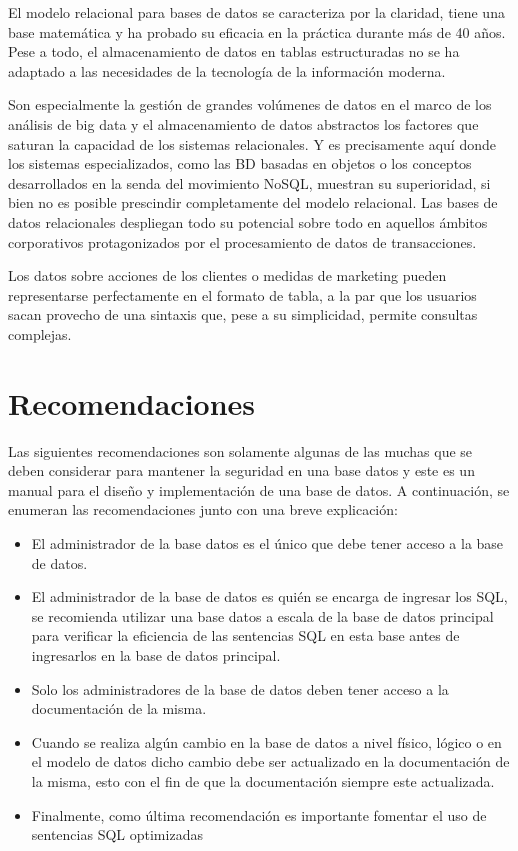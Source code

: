\documentclass[twoside,twocolumn]{article}
\begin{document}
El modelo relacional para bases de datos se caracteriza por la claridad, tiene una base matemática y ha probado su eficacia en la práctica durante más de 40 años. Pese a todo, el almacenamiento de datos en tablas estructuradas no se ha adaptado a las necesidades de la tecnología de la información moderna.

Son especialmente la gestión de grandes volúmenes de datos en el marco de los análisis de big data y el almacenamiento de datos abstractos los factores que saturan la capacidad de los sistemas relacionales. Y es precisamente aquí donde los sistemas especializados, como las BD basadas en objetos o los conceptos desarrollados en la senda del movimiento NoSQL, muestran su superioridad, si bien no es posible prescindir completamente del modelo relacional. Las bases de datos relacionales despliegan todo su potencial sobre todo en aquellos ámbitos corporativos protagonizados por el procesamiento de datos de transacciones.

Los datos sobre acciones de los clientes o medidas de marketing pueden representarse perfectamente en el formato de tabla, a la par que los usuarios sacan provecho de una sintaxis que, pese a su simplicidad, permite consultas complejas.

\section{Recomendaciones}

Las siguientes recomendaciones son solamente algunas de las muchas que se deben considerar para mantener la seguridad en una base datos y este es un manual para el diseño y implementación de una base de datos. A continuación, se enumeran las recomendaciones junto con una breve explicación:

\begin{itemize}
\item El administrador de la base datos es el único que debe tener acceso a la base de datos.
\item El administrador de la base de datos es quién se encarga de ingresar los SQL, se recomienda utilizar una base datos a escala de la base de datos principal para verificar la eficiencia de las sentencias SQL en esta base antes de ingresarlos en la base de datos principal.
\item Solo los administradores de la base de datos deben tener acceso a la documentación de la misma.
\item Cuando se realiza algún cambio en la base de datos a nivel físico, lógico o en el modelo de datos dicho cambio debe ser actualizado en la documentación de la misma, esto con el fin de que la documentación siempre este actualizada.
\item Finalmente, como última recomendación es importante fomentar el uso de sentencias SQL optimizadas
\end{itemize}
\end{document}
